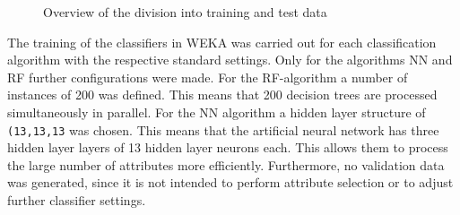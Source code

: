 \begin{figure}[ht]
  \qquad
  \qquad
  \caption{Overview of the division into training and test data\label{fig:splits}}
\end{figure}

The training of the classifiers in WEKA was carried out for each classification algorithm with the respective standard settings. Only for the algorithms NN and RF further configurations were made. For the RF-algorithm a number of instances of 200 was defined. This means that 200 decision trees are processed simultaneously in parallel. For the NN algorithm a hidden layer structure of \texttt{(13,13,13} was chosen. This means that the artificial neural network has three hidden layer layers of 13 hidden layer neurons each. This allows them to process the large number of attributes more efficiently. Furthermore, no validation data was generated, since it is not intended to perform attribute selection or to adjust further classifier settings.

